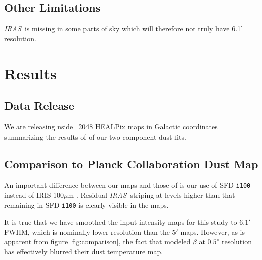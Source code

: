 \documentclass{emulateapj}
\newcommand{\IRAS}{{\it IRAS}}
\begin{document}
\subsection{Other Limitations}
\IRAS~is missing in some parts of sky which will therefore not truly have 6.1' 
resolution.

\section{Results}
\label{sec:results}




\subsection{Data Release}
We are releasing nside=2048 HEALPix maps in Galactic coordinates summarizing 
the results of of our two-component dust fits.



\subsection{Comparison to Planck Collaboration Dust Map}
An important difference between our maps and those of \cite{planckdust} is our 
use of SFD \verb|i100| instead of IRIS 100$\mu$m \citep{IRIS}. Residual 
\IRAS~striping at levels higher than that remaining in SFD \verb|i100| is 
clearly visible in the \cite{planckdust} maps.

It is true that we have smoothed the input intensity maps for this study 
to $6.1'$ FWHM, which is nominally lower resolution than the $5'$ 
\cite{planckdust} maps. However, as is apparent from figure 
\ref{fig:comparison}, the fact that \cite{planckdust} modeled $\beta$ at 
$0.5^{\circ}$ resolution has effectively blurred their dust temperature map.
\end{document}
